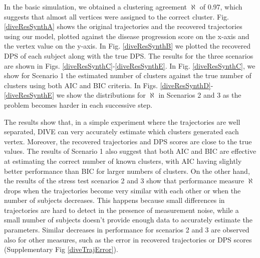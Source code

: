 In the basic simulation, we obtained a clustering agreement $\aleph$ of 0.97, which suggests that almost all vertices were assigned to the correct cluster. Fig. \ref{diveResSynthA} shows the original trajectories and the recovered trajectories using our model, plotted against the disease progression score on the x-axis and the vertex value on the y-axis. In Fig. \ref{diveResSynthB} we plotted the recovered DPS of each subject along with the true DPS. The results for the three scenarios are shown in Figs. \ref{diveResSynthC}-\ref{diveResSynthE}. In Fig. \ref{diveResSynthC}, we show for Scenario 1 the estimated number of clusters against the true number of clusters using both AIC and BIC criteria. In Figs. \ref{diveResSynthD}-\ref{diveResSynthE} we show the distributions for $\aleph$ in Scenarios 2 and 3 as the problem becomes harder in each successive step. 


The results show that, in a simple experiment where the trajectories are well separated, DIVE can very accurately estimate which clusters generated each vertex. Moreover, the recovered trajectories and DPS scores are close to the true values. The results of Scenario 1 also suggest that both AIC and BIC are effective at estimating the correct number of known clusters, with AIC having slightly better performance than BIC for larger numbers of clusters. On the other hand, the results of the stress test scenarios 2 and 3 show that performance measure $\aleph$ drops when the trajectories become very similar with each other or when the number of subjects decreases. This happens because small differences in trajectories are hard to detect in the presence of measurement noise, while a small number of subjects doesn't provide enough data to accurately estimate the parameters. Similar decreases in performance for scenarios 2 and 3 are observed also for other measures, such as the error in recovered trajectories or DPS scores (Supplementary Fig \ref{diveTrajError}).


